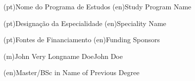 \ntdegreename*(pt){Nome do Programa de Estudos}
\ntdegreename*(en){Study Program Name}

\ntspecialization*(pt){Designação da Especialidade}
\ntspecialization*(en){Speciality Name}

\ntsponsors(pt){Fontes de Financiamento}
\ntsponsors(en){Funding Sponsors}

\ntauthorname(m){John Very Longname Doe}{John Doe}

\ntauthordegree(en){Master/BSc in Name of Previous Degree}



